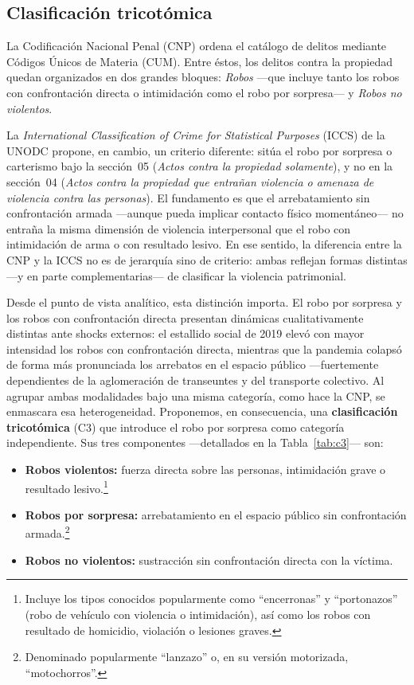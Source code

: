 \documentclass[12pt,a4paper]{article}
\begin{document}
\subsection{Clasificaci\'on tricot\'omica}
\label{sub:clasificacion}

La Codificaci\'on Nacional Penal (CNP) ordena el cat\'alogo de delitos
mediante C\'odigos \'Unicos de Materia (CUM). Entre \'estos, los delitos
contra la propiedad quedan organizados en dos grandes bloques:
\textit{Robos} ---que incluye tanto los robos con confrontaci\'on directa
o intimidaci\'on como el robo por sorpresa--- y \textit{Robos no violentos}.

La \textit{International Classification of Crime for Statistical Purposes}
(ICCS) de la UNODC propone, en cambio, un criterio diferente: sit\'ua el
robo por sorpresa o carterismo bajo la secci\'on~05 (\textit{Actos contra
la propiedad solamente}), y no en la secci\'on~04 (\textit{Actos contra la
propiedad que entra\~nan violencia o amenaza de violencia contra las
personas}). El fundamento es que el arrebatamiento sin confrontaci\'on
armada ---aunque pueda implicar contacto f\'isico moment\'aneo--- no
entra\~na la misma dimensi\'on de violencia interpersonal que el robo con
intimidaci\'on de arma o con resultado lesivo. En ese sentido, la diferencia
entre la CNP y la ICCS no es de jerarqu\'ia sino de criterio: ambas reflejan
formas distintas ---y en parte complementarias--- de clasificar la violencia
patrimonial.

Desde el punto de vista anal\'itico, esta distinci\'on importa. El robo
por sorpresa y los robos con confrontaci\'on directa presentan din\'amicas
cualitativamente distintas ante shocks externos: el estallido social de 2019
elev\'o con mayor intensidad los robos con confrontaci\'on directa, mientras
que la pandemia colaps\'o de forma m\'as pronunciada los arrebatos en el
espacio p\'ublico ---fuertemente dependientes de la aglomeraci\'on de
transeuntes y del transporte colectivo. Al agrupar ambas modalidades bajo
una misma categor\'ia, como hace la CNP, se enmascara esa heterogeneidad.
Proponemos, en consecuencia, una \textbf{clasificaci\'on tricot\'omica} (C3)
que introduce el robo por sorpresa como categor\'ia independiente. Sus tres
componentes ---detallados en la Tabla~\ref{tab:c3}--- son:

\begin{itemize}
  \item \textbf{Robos violentos:} fuerza directa sobre las personas,
    intimidaci\'on grave o resultado lesivo.\footnote{Incluye los tipos
    conocidos popularmente como ``encerronas'' y ``portonazos'' (robo de
    veh\'iculo con violencia o intimidaci\'on), as\'i como los robos con
    resultado de homicidio, violaci\'on o lesiones graves.}
  \item \textbf{Robos por sorpresa:} arrebatamiento en el espacio p\'ublico
    sin confrontaci\'on armada.\footnote{Denominado popularmente
    ``lanzazo'' o, en su versi\'on motorizada, ``motochorros''.}
  \item \textbf{Robos no violentos:} sustracci\'on sin confrontaci\'on
    directa con la v\'ictima.
\end{itemize}
\end{document}
